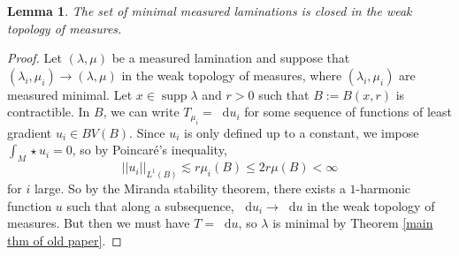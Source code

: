 \documentclass[reqno,11pt]{amsart}
\newcommand*\dif{\mathop{}\!\mathrm{d}}
\DeclareMathOperator{\supp}{supp}
\newtheorem{lemma}[theorem]{Lemma}
\theoremstyle{definition}
\numberwithin{equation}{section}
\begin{document}
\begin{lemma}\label{limits of measured geodesic lams are geodesic}
	The set of minimal measured laminations is closed in the weak topology of measures.
\end{lemma}
\begin{proof}
Let $(\lambda, \mu)$ be a measured lamination and suppose that $(\lambda_i, \mu_i) \to (\lambda, \mu)$ in the weak topology of measures, where $(\lambda_i, \mu_i)$ are measured minimal.
Let $x \in \supp \lambda$ and $r > 0$ such that $B := B(x, r)$ is contractible.
In $B$, we can write $T_{\mu_i} = \dif u_i$ for some sequence of functions of least gradient $u_i \in BV(B)$.
Since $u_i$ is only defined up to a constant, we impose $\int_M \star u_i = 0$, so by Poincar\'e's inequality,
$$||u_i||_{L^1(B)} \lesssim r\mu_i(B) \leq 2r \mu(B) < \infty$$
for $i$ large.
So by the Miranda stability theorem, there exists a $1$-harmonic function $u$ such that along a subsequence, $\dif u_i \to \dif u$ in the weak topology of measures.
But then we must have $T = \dif u$, so $\lambda$ is minimal by Theorem \ref{main thm of old paper}.
\end{proof}
\end{document}
